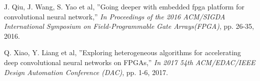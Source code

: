\documentclass[conference]{IEEEtran}
\begin{document}
\begin{thebibliography}{9}
J. Qiu, J. Wang, S. Yao et al,
''Going deeper with embedded fpga platform for convolutional neural network,''
{\em In Proceedings of the 2016 ACM/SIGDA International Symposium on Field-Programmable Gate Arrays(FPGA)}, pp. 26-35, 2016.

Q. Xiao, Y. Liang et al,
''Exploring heterogeneous algorithms for accelerating deep convolutional neural networks on FPGAs,''
{\em In 2017 54th ACM/EDAC/IEEE Design Automation Conference (DAC)}, pp. 1-6, 2017.

%
%
%
%

\end{thebibliography}

\end{document}
